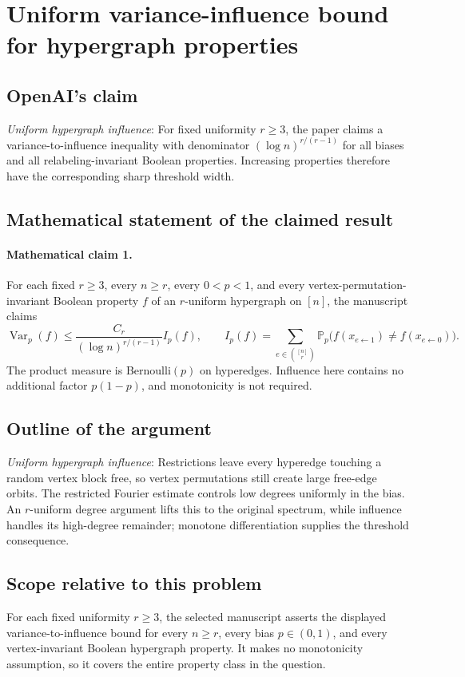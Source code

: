 \documentclass[11pt]{article}
\begin{document}
\section*{Uniform variance-influence bound for hypergraph properties}

\subsection{OpenAI's claim}
\textit{Uniform hypergraph influence}: For fixed uniformity $r\ge3$, the paper claims a variance-to-influence inequality with denominator $(\log n)^{r/(r-1)}$ for all biases and all relabeling-invariant Boolean properties. Increasing properties therefore have the corresponding sharp threshold width.

\subsection{Mathematical statement of the claimed result}
\paragraph{Mathematical claim 1.} For each fixed $r\ge3$, every $n\ge r$, every $0<p<1$, and every vertex-permutation-invariant Boolean property $f$ of an $r$-uniform hypergraph on $[n]$, the manuscript claims \[\operatorname{Var}_p(f)\le\frac{C_r}{(\log n)^{r/(r-1)}}I_p(f),\qquad I_p(f)=\sum_{e\in\binom{[n]}r}\mathbb P_p\bigl(f(x_{e\leftarrow1})\ne f(x_{e\leftarrow0})\bigr).\] The product measure is Bernoulli$(p)$ on hyperedges. Influence here contains no additional factor $p(1-p)$, and monotonicity is not required.

\subsection{Outline of the argument}
\textit{Uniform hypergraph influence}: Restrictions leave every hyperedge touching a random vertex block free, so vertex permutations still create large free-edge orbits. The restricted Fourier estimate controls low degrees uniformly in the bias. An $r$-uniform degree argument lifts this to the original spectrum, while influence handles its high-degree remainder; monotone differentiation supplies the threshold consequence.

\subsection{Scope relative to this problem}
For each fixed uniformity $r\ge3$, the selected manuscript asserts the displayed variance-to-influence bound for every $n\ge r$, every bias $p\in(0,1)$, and every vertex-invariant Boolean hypergraph property. It makes no monotonicity assumption, so it covers the entire property class in the question.
\end{document}
